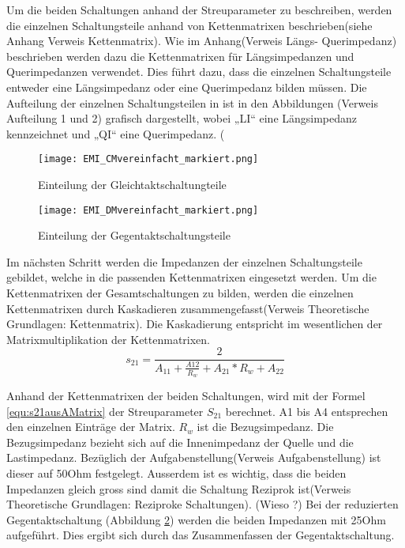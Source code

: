 Um die beiden Schaltungen anhand der Streuparameter zu beschreiben, werden die einzelnen Schaltungsteile anhand von Kettenmatrixen beschrieben(siehe Anhang Verweis Kettenmatrix). Wie im Anhang(Verweis Längs- Querimpedanz) beschrieben werden dazu die Kettenmatrixen für Längsimpedanzen und Querimpedanzen verwendet. Dies führt dazu, dass die einzelnen Schaltungsteile entweder eine Längsimpedanz oder eine Querimpedanz bilden müssen. Die Aufteilung der einzelnen Schaltungsteilen in ist in den Abbildungen (Verweis Aufteilung 1 und 2) grafisch dargestellt, wobei „LI“ eine Längsimpedanz kennzeichnet und „QI“ eine Querimpedanz. (%
\begin{figure}[H]
		\centering
		\texttt{[image: EMI\_CMvereinfacht\_markiert.png]}
		\label{fig:cmschaltung}
		\caption{Einteilung der Gleichtaktschaltungteile}
\end{figure}

\begin{figure}[H]
		\centering
		\texttt{[image: EMI\_DMvereinfacht\_markiert.png]}
		\label{fig:dmschaltung}
		\caption{Einteilung der Gegentaktschaltungsteile}
\end{figure}

Im nächsten Schritt werden die Impedanzen der einzelnen Schaltungsteile gebildet, welche in die passenden Kettenmatrixen eingesetzt werden. Um die Kettenmatrixen der Gesamtschaltungen zu bilden, werden die einzelnen Kettenmatrixen durch Kaskadieren zusammengefasst(Verweis Theoretische Grundlagen: Kettenmatrix). Die Kaskadierung entspricht im wesentlichen der Matrixmultiplikation der Kettenmatrixen. \\

\begin{equation}\label{equ:s21ausAMatrix}
s_{21} = \frac{2}{A_{11}+\frac{A{12}}{R_w}+A_{21}*R_w+A_{22}}
\end{equation}

Anhand der Kettenmatrixen der beiden Schaltungen, wird mit der Formel \ref{equ:s21ausAMatrix} der Streuparameter $S_{21}$ berechnet. A1 bis A4 entsprechen den einzelnen Einträge der Matrix. $R_w$ ist die Bezugsimpedanz. Die Bezugsimpedanz bezieht sich auf die Innenimpedanz der Quelle und die Lastimpedanz. Bezüglich der Aufgabenstellung(Verweis Aufgabenstellung) ist dieser auf 50Ohm festgelegt. Ausserdem ist es wichtig, dass die beiden Impedanzen gleich gross sind damit die Schaltung Reziprok ist(Verweis Theoretische Grundlagen: Reziproke Schaltungen). (Wieso ?) 
Bei der reduzierten Gegentaktschaltung (Abbildung \ref{fig:dmschaltung}) werden die beiden Impedanzen mit 25Ohm aufgeführt. Dies ergibt sich durch das Zusammenfassen der Gegentaktschaltung.\\

